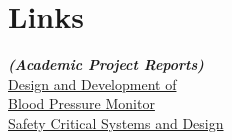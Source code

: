 \documentclass[letterpaper]{deedy-resume} %
\begin{document}
\begin{minipage}[t]{0.33\textwidth} %

\section{Links}
\footnotesize \textit{\textbf{(Academic Project Reports)} } \\
\textbullet{} \href{http://www.scribd.com/doc/248438366/Design-and-Development-of-a-Blood-Pressure-Monitor}{Design and Development of \\ \hphantom{\textbullet{}}Blood Pressure Monitor} \\
\textbullet{} \href{http://www.scribd.com/doc/248440573/Safety-Critical-Systems}{Safety Critical Systems and Design} \\

\sectionspace %

\end{minipage} %
\hfill
\end{document}
